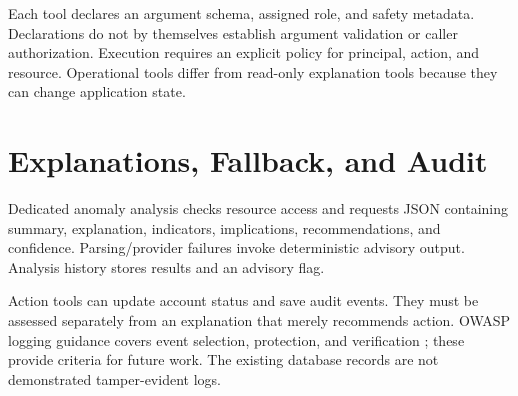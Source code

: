 Each tool declares an argument schema, assigned role, and safety metadata. Declarations do not by themselves establish argument validation or caller authorization. Execution requires an explicit policy for principal, action, and resource. Operational tools differ from read-only explanation tools because they can change application state.

\section{Explanations, Fallback, and Audit}
Dedicated anomaly analysis checks resource access and requests JSON containing summary, explanation, indicators, implications, recommendations, and confidence. Parsing/provider failures invoke deterministic advisory output. Analysis history stores results and an advisory flag.

Action tools can update account status and save audit events. They must be assessed separately from an explanation that merely recommends action. OWASP logging guidance covers event selection, protection, and verification \cite{owasp}; these provide criteria for future work. The existing database records are not demonstrated tamper-evident logs.
